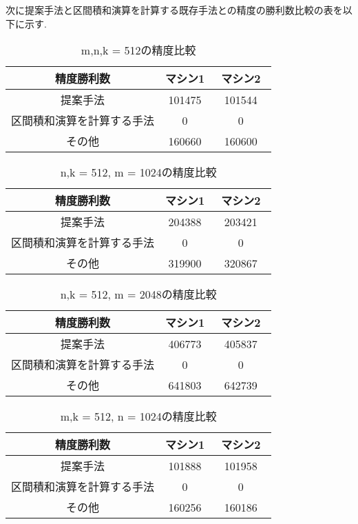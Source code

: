 \documentclass[11pt,a4paper]{jsreport}
\theoremstyle{definition}
\begin{document}
\indent 次に提案手法と区間積和演算を計算する既存手法との精度の勝利数比較の表を以下に示す.

\begin{table}[H]
\centering
\small
\caption{m,n,k = 512の精度比較}
\begin{tabular}{c|c|c}
\hline
精度勝利数 & マシン1 & マシン2　\\ \hline \hline
提案手法 & 101475 & 101544 \\ \hline
区間積和演算を計算する手法 & 0 & 0 \\ \hline
その他 & 160660 & 160600 \\ \hline
\end{tabular}
\end{table}

\begin{table}[H]
\centering
\small
\caption{n,k = 512, m = 1024の精度比較}
\begin{tabular}{c|c|c}
\hline
精度勝利数 & マシン1 & マシン2　\\ \hline \hline
提案手法 & 204388 & 203421 \\ \hline
区間積和演算を計算する手法 & 0 & 0 \\ \hline
その他 & 319900 & 320867 \\ \hline
\end{tabular}
\end{table}

\begin{table}[H]
\centering
\small
\caption{n,k = 512, m = 2048の精度比較}
\begin{tabular}{c|c|c}
\hline
精度勝利数 & マシン1 & マシン2　\\ \hline \hline
提案手法 & 406773 & 405837 \\ \hline
区間積和演算を計算する手法 & 0 &0 \\ \hline
その他 & 641803 & 642739 \\ \hline
\end{tabular}
\end{table}

\begin{table}[H]
\centering
\small
\caption{m,k = 512, n = 1024の精度比較}
\begin{tabular}{c|c|c}
\hline
精度勝利数 & マシン1 & マシン2　\\ \hline \hline
提案手法 & 101888 & 101958 \\ \hline
区間積和演算を計算する手法 & 0 & 0 \\ \hline
その他 & 160256 & 160186 \\ \hline
\end{tabular}
\end{table}
\end{document}

